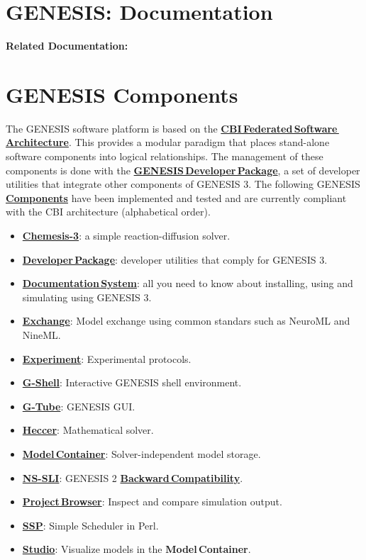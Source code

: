 \documentclass[12pt]{article}
\begin{document}
\section*{GENESIS: Documentation}

{\bf Related Documentation:}

\section*{GENESIS Components}

The GENESIS software platform is based on the
\href{../genesis-overview/genesis-overview.tex}{\bf
  CBI\,Federated\,Software\,Architecture}. This provides a modular
paradigm that places stand-alone software components into logical
relationships.  The management of these components is done with the
\href{../developer-package/developer-package.tex}{\bf
  GENESIS\,Developer\,Package}, a set of developer utilities that
integrate other components of GENESIS 3.  The following GENESIS
\href{../reserved-words/reserved-words.tex}{\bf Components} have been
implemented and tested and are currently compliant with the CBI
architecture (alphabetical order).

\begin{itemize}
   \item[]\href{../chemesis-3-log/chemesis-3-log.tex}{\bf Chemesis-3}: a simple reaction-diffusion solver.
   \item[]\href{../developer-package/developer-package.tex}{\bf Developer\,Package}: developer utilities that comply for GENESIS 3.
   \item[]\href{../documentation-overview/documentation-overview.tex}{\bf Documentation\,System}: all you need to know about installing, using and simulating using GENESIS 3.
   \item[]\href{../exchange/exchange.tex}{\bf Exchange}: Model exchange using common standars such as NeuroML and NineML.
   \item[]\href{../experiment/experiment.tex}{\bf Experiment}: Experimental protocols.
   \item[]\href{../gshell/gshell.tex}{\bf G-Shell}: Interactive GENESIS shell environment.
   \item[]\href{../gtube/gtube.tex}{\bf G-Tube}: GENESIS GUI.
   \item[]\href{../heccer/heccer.tex}{\bf Heccer}: Mathematical solver.
   \item[]\href{../model-container/model-container.tex}{\bf Model\,Container}: Solver-independent model storage.
   \item[]\href{../ns-sli/ns-sli.tex}{\bf NS-SLI}: GENESIS 2 \href{../backward-compatibility/backward-compatibility.tex}{\bf Backward\,Compatibility}.
   \item[]\href{../project-browser/project-browser.tex}{\bf Project\,Browser}: Inspect and compare simulation output.
   \item[]\href{../ssp/ssp.tex}{\bf SSP}: Simple Scheduler in Perl.
   \item[]\href{../studio/studio.tex}{\bf Studio}: Visualize models in the {\bf Model\,Container}.
\end{itemize}
\end{document}
